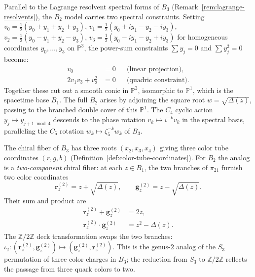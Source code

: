 \begin{remark}
\label{rem:B2-spectral-forms}
Parallel to the Lagrange resolvent spectral forms of $B_3$
(Remark~\ref{rem:lagrange-resolvents}), the $B_2$ model carries two
spectral constraints.  Setting $v_0 = \tfrac{1}{2}(y_0+y_1+y_2+y_3)$,
$v_1 = \tfrac{1}{2}(y_0+iy_1-y_2-iy_3)$,
$v_2 = \tfrac{1}{2}(y_0-y_1+y_2-y_3)$,
$v_3 = \tfrac{1}{2}(y_0-iy_1-y_2+iy_3)$ for homogeneous coordinates
$y_0,\dots,y_3$ on $\mathbb{P}^3$, the power-sum constraints
$\sum y_j = 0$ and $\sum y_j^2 = 0$ become:
\begin{align}
  v_0 &= 0
    &&\text{(linear projection),}
    \label{eq:B2-resolvent-linear}\\[4pt]
  2v_1 v_3 + v_2^2 &= 0
    &&\text{(quadric constraint).}
    \label{eq:B2-resolvent-quadric}
\end{align}
Together these cut out a smooth conic in $\mathbb{P}^2$,
isomorphic to $\mathbb{P}^1$, which is the spacetime base $B_1$.  The
full $B_2$ arises by adjoining the square root $w = \sqrt{\Delta(z)}$,
passing to the branched double cover of this $\mathbb{P}^1$.
The $C_4$ cyclic action $y_j\mapsto y_{j+1\bmod 4}$ descends to
the phase rotation $v_k\mapsto i^{-k}v_k$ in the spectral basis,
paralleling the $C_5$ rotation $w_k\mapsto\zeta_5^{-k}w_k$ of $B_3$.
\end{remark}

\begin{remark}
\label{rem:B2-color-tube}
The chiral fiber of $B_3$ has three roots $(x_2,x_3,x_4)$ giving three
color tube coordinates $(r,g,b)$
(Definition~\ref{def:color-tube-coordinates}).  For $B_2$ the analog is
a \emph{two-component} chiral fiber: at each $z\in B_1$, the two
branches of $\pi_{21}$ furnish two color coordinates
\begin{equation}\label{eq:B2-color-coords}
  \mathbf{r}^{(2)}_z = z + \sqrt{\Delta(z)},
  \qquad
  \mathbf{g}^{(2)}_z = z - \sqrt{\Delta(z)}.
\end{equation}
Their sum and product are
\begin{align}
  \mathbf{r}^{(2)}_z + \mathbf{g}^{(2)}_z &= 2z,
    \label{eq:B2-vieta-sum}\\[4pt]
  \mathbf{r}^{(2)}_z \cdot \mathbf{g}^{(2)}_z &= z^2 - \Delta(z).
    \label{eq:B2-vieta-product}
\end{align}
The $\mathbb{Z}/2\mathbb{Z}$ deck transformation swaps the two branches:
$\iota_2\colon (\mathbf{r}^{(2)}_z, \mathbf{g}^{(2)}_z) \mapsto (\mathbf{g}^{(2)}_z, \mathbf{r}^{(2)}_z)$.
This is the genus-$2$ analog of the $S_3$ permutation of three color
charges in $B_3$; the reduction from $S_3$ to $\mathbb{Z}/2\mathbb{Z}$
reflects the passage from three quark colors to two.
\end{remark}


